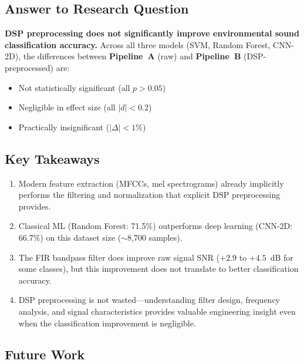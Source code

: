 \documentclass[conference]{IEEEtran}
\newcommand{\pipeA}{\textbf{Pipeline~A}}
\newcommand{\pipeB}{\textbf{Pipeline~B}}
\begin{document}
\subsection{Answer to Research Question}

\textbf{DSP preprocessing does not significantly improve environmental sound classification accuracy.} Across all three models (SVM, Random Forest, CNN-2D), the differences between \pipeA{} (raw) and \pipeB{} (DSP-preprocessed) are:
\begin{itemize}
    \item Not statistically significant (all $p > 0.05$)
    \item Negligible in effect size (all $|d| < 0.2$)
    \item Practically insignificant ($|\Delta| < 1\%$)
\end{itemize}

\subsection{Key Takeaways}

\begin{enumerate}
    \item Modern feature extraction (MFCCs, mel spectrograms) already implicitly performs the filtering and normalization that explicit DSP preprocessing provides.

    \item Classical ML (Random Forest: 71.5\%) outperforms deep learning (CNN-2D: 66.7\%) on this dataset size ($\sim$8,700 samples).

    \item The FIR bandpass filter does improve raw signal SNR ($+2.9$ to $+4.5$~dB for some classes), but this improvement does not translate to better classification accuracy.

    \item DSP preprocessing is not wasted---understanding filter design, frequency analysis, and signal characteristics provides valuable engineering insight even when the classification improvement is negligible.
\end{enumerate}

\subsection{Future Work}
\end{document}
